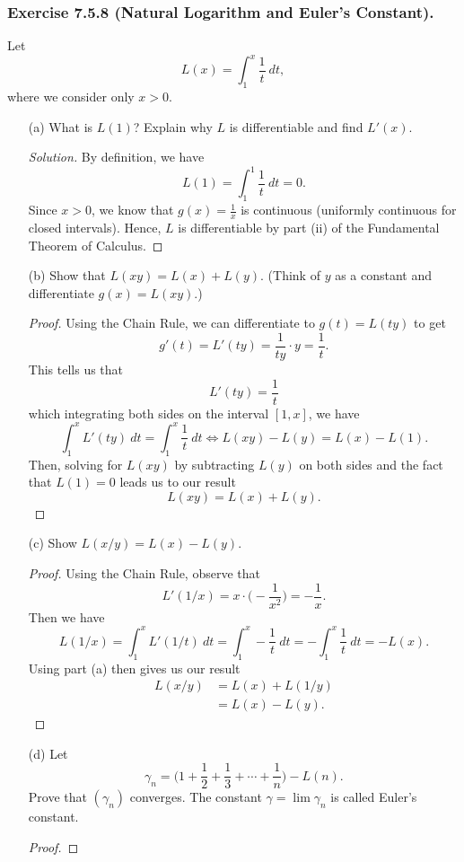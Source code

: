 \subsubsection{Exercise 7.5.8 (Natural Logarithm and Euler's Constant).} Let 
\[  L(x) = \int_{ 1 }^{ x } \frac{ 1 }{ t }  \  dt, \]
where we consider only \( x > 0  \).
\begin{enumerate}
    \item[(a)] What is \( L(1)  \)? Explain why \( L  \) is differentiable and find \( L'(x)  \).
		\begin{proof}[Solution]
		By definition, we have 
		\[  L(1) = \int_{ 1 }^{ 1 } \frac{ 1 }{ t } \   dt = 0. \] Since \( x > 0  \), we know that \( g(x) = \frac{ 1 }{ x  }  \) is continuous (uniformly continuous for closed intervals). Hence, \( L  \) is differentiable by part (ii) of the Fundamental Theorem of Calculus.
		\end{proof}
	\item[(b)] Show that \( L(xy) = L(x) + L(y)  \). (Think of \( y  \) as a constant and differentiate \( g(x) = L(xy)  \).) 
		\begin{proof}
		Using the Chain Rule, we can differentiate to \( g(t) = L(ty)  \) to get 
		\[  g'(t) = L'(ty) = \frac{ 1 }{ ty } \cdot y = \frac{ 1 }{ t }.  \]
		This tells us that 
		\[  L'(ty) = \frac{ 1 }{ t } \]
		which integrating both sides on the interval \( [1,x]  \), we have 
		\[  \int_{ 1 }^{ x } L'(ty)   \ dt = \int_{ 1 }^{ x } \frac{ 1 }{ t } \    dt \iff L(xy) - L(y) = L(x) - L(1)   .   \]
	Then, solving for \( L(xy)  \) by subtracting \( L(y)  \) on both sides and the fact that \( L(1) = 0  \) leads us to our result
	\[  L(xy) = L(x) + L(y). \]
		\end{proof}
	\item[(c)] Show \( L(x/y) = L(x) - L(y)  \).
		\begin{proof}
			Using the Chain Rule, observe that
		\[  L'(1/x) = x \cdot \Big( - \frac{ 1 }{ x^2 }  \Big) = -\frac{ 1 }{ x }.    \]
		Then we have 
		\[ L(1/x) = \int_{ 1 }^{ x } L'(1/t) \ dt = \int_{ 1 }^{ x } - \frac{ 1 }{ t } \    dt  = - \int_{ 1 }^{ x } \frac{ 1 }{ t } \    dt = - L(x). \]
		Using part (a) then gives us our result  
		\begin{align*}
		    L(x/y) &= L(x) + L(1/y) \\
				   &= L(x) - L(y).
		\end{align*}
		\end{proof}
	\item[(d)] Let 
		\[  \gamma_{n} = \Big( 1 + \frac{ 1 }{ 2 } + \frac{ 1 }{ 3 } + \dotsb + \frac{ 1 }{ n }  \Big) - L(n). \]
		Prove that \( (\gamma_{n}) \) converges. The constant \( \gamma = \lim \gamma_{n} \) is called Euler's constant. 
		\begin{proof}
		

\end{proof}
\end{enumerate}
